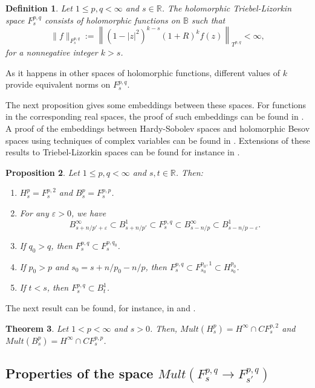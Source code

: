 \documentclass[12pt,twoside,leqno,final]{amsart}
\theoremstyle{plain}
\newtheorem{thm}{Theorem}[section]
\newtheorem{defn}[thm]{Definition}
\newtheorem{prop}[thm]{Proposition}
\begin{document}
\begin{defn} 
Let $1\le p,q<\infty$ and $s\in{{\mathbb R}}$.
The holomorphic Triebel-Lizorkin space $F^{p,q}_s$ consists of holomorphic functions on ${{\mathbb B}}$ such that 
$$
\|f\|_{F^{p,q}_s}:=\left\|(1-|z|^2)^{k-s}(1+R)^{k} f(z)\right\|_{T^{p,q}}<\infty,
$$
for a  nonnegative integer $k>s$.
\end{defn}

As it happens in other spaces of holomorphic functions,  
 different values of $k$ provide equivalent norms on $F^{p,q}_s$.
 

The next proposition gives some embeddings between these spaces. For functions in the corresponding real spaces, the proof of such embeddings can be found in \cite{Tr}.
A proof of the embeddings between  Hardy-Sobolev spaces  and  holomorphic Besov spaces  
using techniques of complex variables can be found in \cite{beatrousburbea}. 
Extensions of these results to Triebel-Lizorkin spaces can be found 
for instance in \cite[Theorem 4.1]{Or-Fa2}. 

\begin{prop}\label{prop:embedF}
Let $1\le p,q<\infty$ and $s,t\in{{\mathbb R}}$. Then:  
\begin{enumerate}
	\item $H^p_s=F^{p,2}_s$ and  $B^p_s=F^{p,p}_s$.
	
\item For any ${\varepsilon}>0$, we have
$$
B^\infty_{s+n/p'+{\varepsilon}}\subset B^1_{s+n/p'}\subset F^{p,q}_s\subset B^\infty_{s-n/p}\subset B^1_{s-n/p-{\varepsilon}}.
$$
\item If $q_0>q$, then $F^{p,q}_s\subset F^{p,q_0}_s$.
\item\label{item:embedF4} If $p_0>p$ and $s_0=s+n/p_0-n/p$, then $F^{p,q}_s\subset F^{p_0,1}_{s_0}\subset H^{p_0}_{s_0}$.
	\item\label{item:embedF5} If $t<s$, then $F^{p,q}_s\subset B^1_{t}$.
\end{enumerate}
\end{prop}

The next result can be found, for instance, in \cite{ortegafabrega} and \cite{Or-Fa3}.
\begin{thm}
Let $1<p<\infty$ and $s>0$. Then, $Mult(H^p_s)=H^\infty\cap CF^{p,2}_s$ and $Mult(B^p_s)=H^\infty\cap CF^{p,p}_s$.
\end{thm}

 \subsection{Properties of the space  $ Mult(F^{p,q}_s\to F^{p,q}_{s'})$}\quad\par
\end{document}
